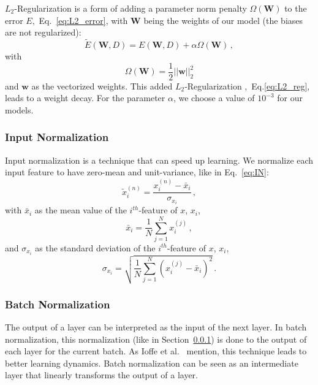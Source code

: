$L_2$-Regularization is a form of adding a parameter norm penalty $\Omega(\textbf{W})$ to the error $E$,~Eq.~\eqref{eq:L2_error}, with $\textbf{W}$ being the weights of our model (the biases are not regularized):
\begin{equation}
\tilde{E}(\textbf{W},D) = E(\textbf{W},D)+\alpha\Omega(\textbf{W})\,,
\label{eq:L2_error}
\end{equation}
with
\begin{equation}
\Omega(\textbf{W})= \frac{1}{2}||\textbf{w}||^2_2
\label{eq:L2_reg}
\end{equation}
and $\textbf{w}$ as the vectorized weights. This added $L_2$-Regularization ,~Eq.\eqref{eq:L2_reg}, leads to a weight decay. For the parameter $\alpha$, we choose a value of $10^{-3}$ for our models.

\subsubsection{Input Normalization}
\label{sssec:num344}

Input normalization is a technique that can speed up learning. We normalize each input feature to have zero-mean and unit-variance, like in Eq.~\eqref{eq:IN}:
\begin{equation}
\tilde{x}^{(n)}_i= \frac{x^{(n)}_i-\bar{x}_i}{\sigma_{x_i}}\,,
\label{eq:IN}
\end{equation}
with $\bar{x}_i$ as the mean value of the $i^{th}$-feature of $x$, $x_i$, 
\begin{equation}
\bar{x}_i = \frac{1}{N}\sum_{j=1}^{N}x^{(j)}_i\,,
\label{eq:mean}
\end{equation}
and $\sigma_{x_i}$ as the standard deviation of the $i^{th}$-feature of $x$, $x_i$,  
\begin{equation}
\sigma_{x_i} = \sqrt{\frac{1}{N}\sum_{j=1}^{N}(x^{(j)}_i-\bar{x}_i)^2}\,.
\label{eq:std}
\end{equation}

\subsubsection{Batch Normalization}
\label{sssec:num345}
The output of a layer can be interpreted as the input of the next layer. 
In batch normalization, this normalization (like in Section~\ref{sssec:num344}) is done to the output of each layer for the current batch. 
As Ioffe et al.~\cite{Ioffe15} mention, this technique leads to better learning dynamics. Batch normalization can be seen as an intermediate layer that linearly transforms the output of a layer.  



